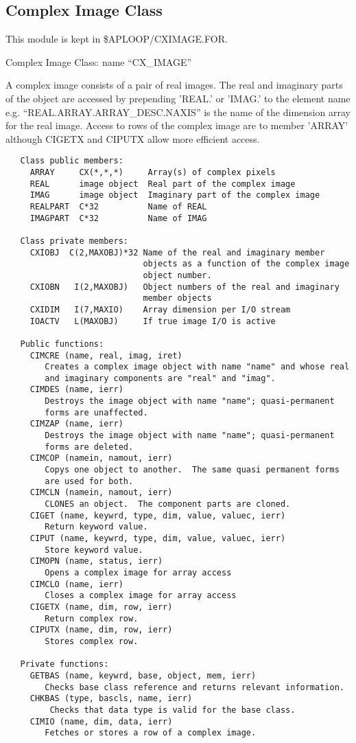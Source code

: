\subsection{Complex Image Class}

   This module is kept in \$APLOOP/CXIMAGE.FOR.

   Complex Image Class: name ``CX\_IMAGE''

A complex image consists of a pair of real images.  The real and
imaginary parts of the object are accessed by prepending 'REAL.' or
'IMAG.' to the element name e.g. ``REAL.ARRAY.ARRAY\_DESC.NAXIS'' is
the name of the dimension array for the real image.  Access to rows
of the complex image are to member 'ARRAY' although CIGETX and
CIPUTX allow more efficient access.

{\small\begin{verbatim}
   Class public members:
     ARRAY     CX(*,*,*)     Array(s) of complex pixels
     REAL      image object  Real part of the complex image
     IMAG      image object  Imaginary part of the complex image
     REALPART  C*32          Name of REAL
     IMAGPART  C*32          Name of IMAG

   Class private members:
     CXIOBJ  C(2,MAXOBJ)*32 Name of the real and imaginary member
                            objects as a function of the complex image
                            object number.
     CXIOBN   I(2,MAXOBJ)   Object numbers of the real and imaginary
                            member objects
     CXIDIM   I(7,MAXIO)    Array dimension per I/O stream
     IOACTV   L(MAXOBJ)     If true image I/O is active

   Public functions:
     CIMCRE (name, real, imag, iret)
        Creates a complex image object with name "name" and whose real
        and imaginary components are "real" and "imag".
     CIMDES (name, ierr)
        Destroys the image object with name "name"; quasi-permanent
        forms are unaffected.
     CIMZAP (name, ierr)
        Destroys the image object with name "name"; quasi-permanent
        forms are deleted.
     CIMCOP (namein, namout, ierr)
        Copys one object to another.  The same quasi permanent forms
        are used for both.
     CIMCLN (namein, namout, ierr)
        CLONES an object.  The component parts are cloned.
     CIGET (name, keywrd, type, dim, value, valuec, ierr)
        Return keyword value.
     CIPUT (name, keywrd, type, dim, value, valuec, ierr)
        Store keyword value.
     CIMOPN (name, status, ierr)
        Opens a complex image for array access
     CIMCLO (name, ierr)
        Closes a complex image for array access
     CIGETX (name, dim, row, ierr)
        Return complex row.
     CIPUTX (name, dim, row, ierr)
        Stores complex row.

   Private functions:
     GETBAS (name, keywrd, base, object, mem, ierr)
        Checks base class reference and returns relevant information.
     CHKBAS (type, bascls, name, ierr)
         Checks that data type is valid for the base class.
     CIMIO (name, dim, data, ierr)
        Fetches or stores a row of a complex image.
\end{verbatim}}

